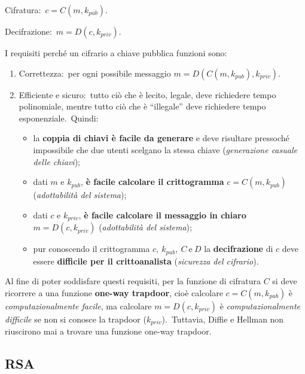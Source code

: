 \begin{flushleft}
    Cifratura:\ $c = C(m, k_{\mathit{pub}})$.\

    Decifrazione:\ $m = D(c, k_{\mathit{priv}})$.\
\end{flushleft}

\noindent I requisiti perché un cifrario a chiave pubblica funzioni sono:

\begin{enumerate}
    \item Correttezza:\ per ogni possibile messaggio $m = D(C(m, k_{\mathit{pub}}), k_{\mathit{priv}})$.\
    \item Efficiente e sicuro:\ tutto ciò che è lecito, legale, deve richiedere tempo polinomiale, mentre tutto ciò che è ``illegale'' deve richiedere tempo esponenziale.\ Quindi:
          \begin{itemize}
              \item la \textbf{coppia di chiavi è facile da generare} e deve risultare pressoché impossibile che due utenti scelgano la stessa chiave (\textit{generazione casuale delle chiavi});
              \item dati $m$ e $k_{\mathit{pub}}$, \textbf{è facile calcolare il crittogramma} $c = C(m, k_{\mathit{pub}})$ (\textit{adottabilità del sistema});
              \item dati $c$ e $k_{\mathit{priv}}$, \textbf{è facile calcolare il messaggio in chiaro} $m = D(c, k_{\mathit{priv}})$ (\textit{adottabilità del sistema});
              \item pur conoscendo il crittogramma $c,\ k_{\mathit{pub}},\ C\ \mathrm{e}\ D$ la \textbf{decifrazione} di $c$ deve essere \textbf{difficile per il crittoanalista} (\textit{sicurezza del cifrario}).
          \end{itemize}
\end{enumerate}

\noindent Al fine di poter soddisfare questi requisiti, per la funzione di cifratura $C$ si deve ricorrere a una funzione \textbf{one-way trapdoor}, cioè calcolare $c = C(m, k_{\mathit{pub}})$ è \textit{computazionalmente facile}, ma calcolare $m = D(c, k_{\mathit{priv}})$ è \textit{computazionalmente difficile} se non si conosce la trapdoor ($k_{\mathit{priv}}$).\
Tuttavia, Diffie e Hellman non riuscirono mai a trovare una funzione one-way trapdoor.\

\subsection{RSA}

